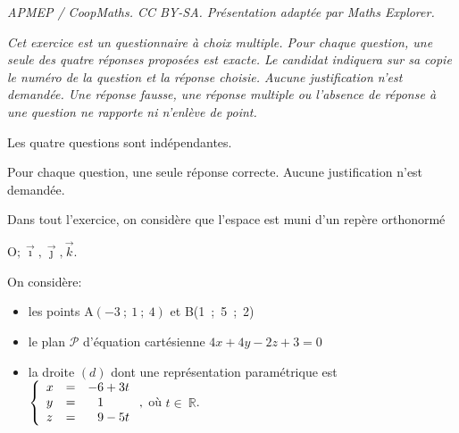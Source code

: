\documentclass[10pt]{article}
\providecommand{\R}{\mathbb{R}}
\providecommand{\Oijk}{\(\mathrm{O};\vec{\imath},\vec{\jmath},\vec{k}\)}
\begin{document}
\noindent\textit{APMEP / CoopMaths. CC BY-SA. Présentation adaptée par Maths Explorer.}\par\medskip
\emph{Cet exercice est un questionnaire à choix multiple.
Pour chaque question, une seule des quatre réponses proposées est exacte. Le candidat indiquera sur sa copie le numéro de la question et la réponse choisie. Aucune justification n'est demandée. Une réponse fausse, une réponse multiple ou l'absence de réponse à une question ne rapporte ni n'enlève de point.}

Les quatre questions sont indépendantes.
 

Pour chaque question, une seule réponse correcte. Aucune justification n’est demandée.

Dans tout l'exercice, on considère que l'espace est muni d'un repère orthonormé

\Oijk.

On considère:

\begin{itemize}[label=$\bullet~$]
\item les points A$(-3~;~1~;~4)$ et B(1~;~5~;~2)
\item le plan $\mathcal{P}$ d'équation cartésienne $4x + 4y -2z + 3 = 0$
\item la droite $(d)$ dont une représentation paramétrique est $\left\{\begin{array}{l c l}
x&=&- 6 + 3t\\y&=&\phantom{-}1\\z&=&\phantom{-}9 - 5t
\end{array}\right.,$ où $t \in~\R$.
\end{itemize}
\end{document}
